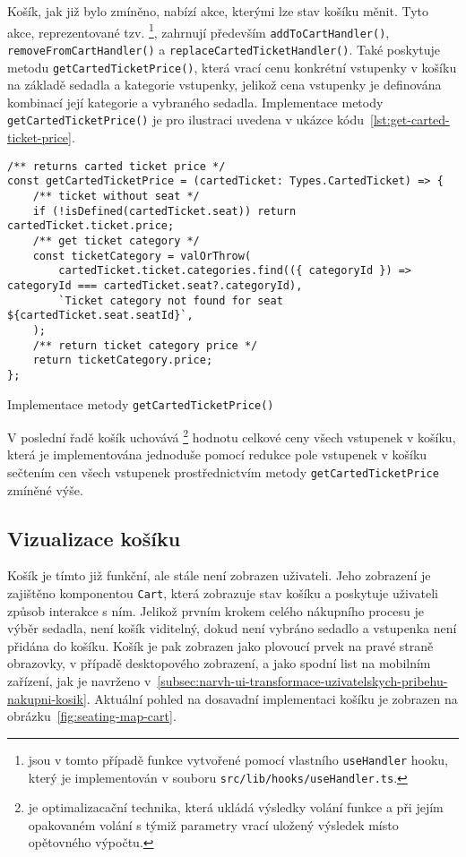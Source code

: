 Košík, jak již bylo zmíněno, nabízí akce, kterými lze stav košíku měnit.
Tyto akce, reprezentované tzv. \footnote{ jsou v tomto případě funkce vytvořené pomocí vlastního \texttt{useHandler} hooku, který je implementován v souboru \texttt{src/lib/hooks/useHandler.ts}.}, zahrnují především \texttt{addToCartHandler()}, \texttt{removeFromCartHandler()} a \texttt{replaceCartedTicketHandler()}.
Také poskytuje metodu \texttt{getCartedTicketPrice()}, která vrací cenu konkrétní vstupenky v košíku na základě sedadla a kategorie vstupenky, jelikož cena vstupenky je definována kombinací její kategorie a vybraného sedadla.
Implementace metody \texttt{getCartedTicketPrice()} je pro ilustraci uvedena v ukázce kódu~\ref{lst:get-carted-ticket-price}.

\begin{listing}[H]
\begin{verbatim}
/** returns carted ticket price */
const getCartedTicketPrice = (cartedTicket: Types.CartedTicket) => {
	/** ticket without seat */
	if (!isDefined(cartedTicket.seat)) return cartedTicket.ticket.price;
	/** get ticket category */
	const ticketCategory = valOrThrow(
		cartedTicket.ticket.categories.find(({ categoryId }) => categoryId === cartedTicket.seat?.categoryId),
		`Ticket category not found for seat ${cartedTicket.seat.seatId}`,
	);
	/** return ticket category price */
	return ticketCategory.price;
};
\end{verbatim}
\caption{Implementace metody \texttt{getCartedTicketPrice()}}
\label{lst:get-carted-ticket-price}
\end{listing}

V poslední řadě košík uchovává \footnote{ je optimalizacační technika, která ukládá výsledky volání funkce a při jejím opakovaném volání s týmiž parametry vrací uložený výsledek místo opětovného výpočtu.} hodnotu celkové ceny všech vstupenek v košíku, která je implementována jednoduše pomocí redukce pole vstupenek v košíku sečtením cen všech vstupenek prostřednictvím metody \texttt{getCartedTicketPrice} zmíněné výše.

\subsection{Vizualizace košíku}
\label{subsec:implementace-kosik-vizualizace}
Košík je tímto již funkční, ale stále není zobrazen uživateli.
Jeho zobrazení je zajištěno komponentou \texttt{Cart}, která zobrazuje stav košíku a poskytuje uživateli způsob interakce s ním.
Jelikož prvním krokem celého nákupního procesu je výběr sedadla, není košík viditelný, dokud není vybráno sedadlo a vstupenka není přidána do košíku.
Košík je pak zobrazen jako plovoucí prvek na pravé straně obrazovky, v případě desktopového zobrazení, a jako spodní list na mobilním zařízení, jak je navrženo v~\ref{subsec:narvh-ui-transformace-uzivatelskych-pribehu-nakupni-kosik}.
Aktuální pohled na dosavadní implementaci košíku je zobrazen na obrázku~\ref{fig:seating-map-cart}.

